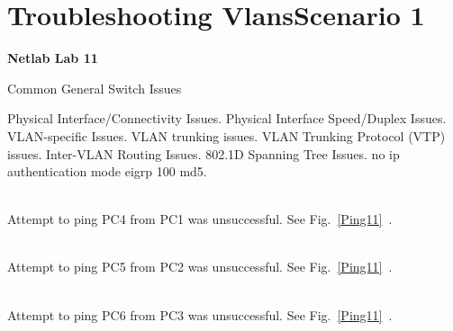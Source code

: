 \documentclass[../EngineeringJournal_CDavis.tex]{subfiles}
\begin{document}

\chapter[Troubleshooting Vlan]{Troubleshooting Vlans\linebreak[1] Scenario 1
\hspace*{\fill February 29, 2020}}
\noindent\textbf{{Netlab Lab 11} }                             


\hspace{0.2cm}
\begin{tcolorbox}[width=6.3in]
Common General Switch Issues
\scriptsize 
  \begin{outline}
    \1 Physical Interface/Connectivity Issues.
    \1 Physical Interface Speed/Duplex Issues.
    \1 VLAN-specific Issues.
    \1 VLAN trunking issues.
    \1 VLAN Trunking Protocol (VTP) issues.
    \1 Inter-VLAN Routing Issues.
    \1 802.1D Spanning Tree Issues.
    \1 no ip authentication mode eigrp 100 md5.  
  \end{outline}
\end{tcolorbox}
\hspace{0.2cm}
\normalsize  
  
\clearpage


\\
Attempt to ping PC4 from PC1 was unsuccessful. See
Fig.~\ref{Ping11}~. 

\noindent{}\\
Attempt to ping PC5 from PC2 was unsuccessful. See
Fig.~\ref{Ping11}~. 

\noindent{}\\
Attempt to ping PC6 from PC3 was unsuccessful. See
Fig.~\ref{Ping11}~. 
\end{document}
